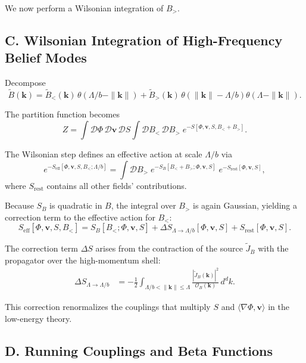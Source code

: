 \documentclass[12pt]{article}
\begin{document}
We now perform a Wilsonian integration of $B_{>}$.

\subsection*{C. Wilsonian Integration of High-Frequency Belief Modes}

Decompose
\[
\tilde{B}(\mathbf{k})
=
\tilde{B}_{<}(\mathbf{k})\,\theta(\Lambda/b - \|\mathbf{k}\|)
+
\tilde{B}_{>}(\mathbf{k})\,\theta(\|\mathbf{k}\|-\Lambda/b)\theta(\Lambda-\|\mathbf{k}\|).
\]

The partition function becomes
\[
Z
=
\int \mathcal{D}\Phi\,\mathcal{D}\mathbf{v}\,\mathcal{D}S
\int \mathcal{D}B_{<}\,\mathcal{D}B_{>}
\;
e^{-S[\Phi,\mathbf{v},S,B_{<}+B_{>}]}.
\]

The Wilsonian step defines an effective action at scale $\Lambda/b$ via
\[
e^{-S_{\text{eff}}[\Phi,\mathbf{v},S,B_{<};\Lambda/b]}
=
\int \mathcal{D}B_{>}\;
e^{-S_B[B_{<}+B_{>};\Phi,\mathbf{v},S]}
\; e^{-S_{\text{rest}}[\Phi,\mathbf{v},S]},
\]
where $S_{\text{rest}}$ contains all other fields’ contributions.

Because $S_B$ is quadratic in $B$, the integral over $B_{>}$ is again
Gaussian, yielding a correction term to the effective action for $B_{<}$:
\begin{equation}
S_{\text{eff}}[\Phi,\mathbf{v},S,B_{<}]
=
S_B[B_{<};\Phi,\mathbf{v},S]
+ \Delta S_{\Lambda\to\Lambda/b}[\Phi,\mathbf{v},S]
+ S_{\text{rest}}[\Phi,\mathbf{v},S].
\end{equation}

The correction term $\Delta S$ arises from the contraction of the source
$\tilde{J}_B$ with the propagator over the high-momentum shell:
\begin{align}
\Delta S_{\Lambda\to\Lambda/b}
&=
- \frac{1}{2}
\int_{\Lambda/b < \|\mathbf{k}\| \le \Lambda}
\frac{|\tilde{J}_B(\mathbf{k})|^2}{\mathcal{O}_B(\mathbf{k})}
\, d^d k.
\end{align}

This correction renormalizes the couplings that multiply $S$ and
$\langle\nabla\Phi,\mathbf{v}\rangle$ in the low-energy theory.

\subsection*{D. Running Couplings and Beta Functions}
\end{document}
